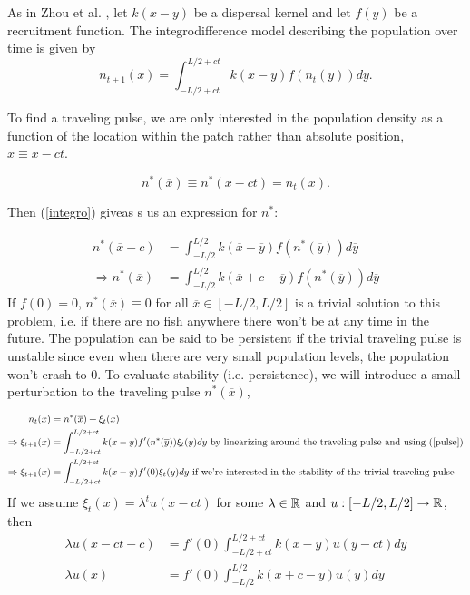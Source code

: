 \documentclass[12pt,english]{article}
\begin{document}
\begin{spacing}{1.9}
\begin{flushleft}
As in Zhou et al. \citep{ZhouKot2011}, let $k(x-y)$ be a dispersal kernel and let $f(y)$ be a recruitment function.  The integrodifference model describing the population over time is given by 
\begin{equation} n_{t+1}(x)=\int_{-L/2+ct}^{L/2+ct}k(x-y)f(n_t(y))dy. \label{integro} \end{equation}

To find a traveling pulse, we are only interested in the population density as a function of the location within the patch rather than absolute position, $\overline{x}\equiv x-ct$.

\begin{equation}n^*(\overline{x})\equiv n^*(x-ct)=n_t(x).   \label{trav} \end{equation}

Then (\ref{integro}) giveas s us an expression for $n^*$:

\begin{align*}
n^*(\overline{x}-c)&=\int_{-L/2}^{L/2}k(\overline{x}-\overline{y})f(n^*(\overline{y}))d\overline y 
\\ \Rightarrow n^*(\overline{x})&=\int_{-L/2}^{L/2}k(\overline{x}+c-\overline{y})f(n^*(\overline{y}))d\overline y \tag{*} \label{pulse}
\end{align*}
If $f(0)=0$, $n^*(\overline{x})\equiv 0$ for all $\overline{x}\in[-L/2,L/2]$ is a trivial solution to this problem, i.e. if there are no fish anywhere there won't be at any time in the future. The population can be said to be persistent if the trivial traveling pulse is unstable since even when there are very small population levels, the population won't crash to $0$.  To evaluate stability (i.e. persistence), we will introduce a small perturbation to the traveling pulse $n^*(\overline{x})$,

\begin{align*}
n_t(x)&=n^*(\overline{x})+\xi_t(x)
\\ \Rightarrow \xi_{t+1}(x)&=\int_{-L/2+ct}^{L/2+ct}k(x-y)f'(n^*(\overline{y}))\xi_t(y)dy \text{ by linearizing around the traveling pulse and using (\ref{pulse})}
\\ \Rightarrow \xi_{t+1}(x)&=\int_{-L/2+ct}^{L/2+ct}k(x-y)f'(0)\xi_t(y)dy \text{ if we're interested in the stability of the trivial traveling pulse}
\end{align*}
If we assume $\xi_t(x)=\lambda^tu(x-ct)$ for some $\lambda\in{\mathbb{R}}$ and $u:[-L/2,L/2]\to{\mathbb{R}}$, then 
\begin{align*}
\lambda u(x-ct-c)&=f'(0)\int_{-L/2+ct}^{L/2+ct}k(x-y)u(y-ct)dy
\\ \lambda u(\overline{x})&=f'(0)\int_{-L/2}^{L/2}k(\overline{x}+c-\overline{y})u(\overline{y})dy
\end{align*}


\end{flushleft}
\end{spacing}
\end{document}
